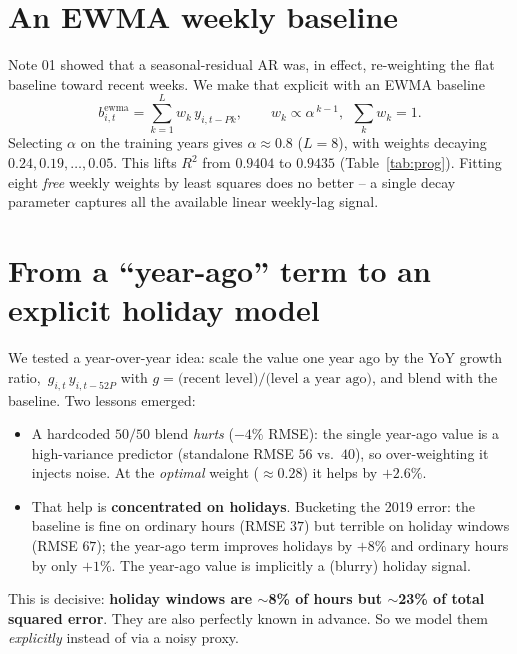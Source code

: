 \documentclass[11pt]{article}
\begin{document}
\section{An EWMA weekly baseline}
Note 01 showed that a seasonal-residual AR was, in effect, re-weighting the flat
baseline toward recent weeks. We make that explicit with an EWMA baseline
\begin{equation}
b^{\text{ewma}}_{i,t}=\sum_{k=1}^{L} w_k\, y_{i,t-Pk},
\qquad w_k\propto \alpha^{\,k-1},\ \ \textstyle\sum_k w_k=1 .
\end{equation}
Selecting $\alpha$ on the training years gives $\alpha\approx0.8$ ($L=8$), with
weights decaying $0.24, 0.19, \dots, 0.05$. This lifts $R^2$ from
$0.9404$ to $0.9435$ (Table~\ref{tab:prog}). Fitting eight \emph{free} weekly
weights by least squares does no better -- a single decay parameter captures all
the available linear weekly-lag signal.

\section{From a ``year-ago'' term to an explicit holiday model}
We tested a year-over-year idea: scale the value one year ago by the YoY growth
ratio, $\,g_{i,t}\,y_{i,t-52P}$ with $g=\text{(recent level)}/\text{(level a
year ago)}$, and blend with the baseline. Two lessons emerged:
\begin{itemize}
\item A hardcoded $50/50$ blend \emph{hurts} ($-4\%$ RMSE): the single year-ago
  value is a high-variance predictor (standalone RMSE $56$ vs.\ $40$), so
  over-weighting it injects noise. At the \emph{optimal} weight ($\approx0.28$)
  it helps by $+2.6\%$.
\item That help is \textbf{concentrated on holidays}. Bucketing the 2019 error:
  the baseline is fine on ordinary hours (RMSE $37$) but terrible on holiday
  windows (RMSE $67$); the year-ago term improves holidays by $+8\%$ and
  ordinary hours by only $+1\%$. The year-ago value is implicitly a (blurry)
  holiday signal.
\end{itemize}
This is decisive: \textbf{holiday windows are $\sim$8\% of hours but $\sim$23\%
of total squared error}. They are also perfectly known in advance. So we model
them \emph{explicitly} instead of via a noisy proxy.
\end{document}
